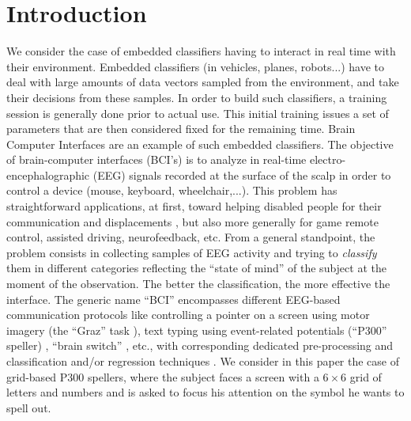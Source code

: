 \documentclass[conference]{IEEEtran}
\begin{document}
\section{Introduction}

We consider the case of embedded classifiers having to interact in real time
with their environment. Embedded classifiers (in vehicles, planes, robots...) have to deal with large
amounts of data vectors sampled from the environment, and take their decisions from these samples. 
In order to build such classifiers, 
a training session is generally done prior to actual use. 
This initial training issues a set of parameters that are then considered fixed 
for the remaining time.
Brain Computer Interfaces are an example of such embedded classifiers. 
The objective of brain-computer interfaces (BCI's) is to analyze in real-time electro-encephalographic (EEG) signals recorded at the surface of the scalp in order to control a device 
(mouse, keyboard, wheelchair,...). This problem has straightforward applications, at first, toward helping disabled people 
for their communication \cite{Farwell88} and displacements \cite{Vanacker2007}, but also more generally for game remote control, 
assisted driving, neurofeedback, etc.
From a general standpoint, the problem consists in collecting samples of EEG activity
 and trying to \emph{classify} them in different categories reflecting the ``state of mind'' of the subject
at the moment of the observation. The better the classification, the more effective the 
interface.
The generic name ``BCI'' encompasses different 
EEG-based communication protocols like controlling a pointer on a screen 
using motor imagery (the ``Graz'' task \cite{Pfurtscheller1997}), text typing 
using event-related potentials (``P300'' speller) \cite{Farwell88}, ``brain switch'' \cite{Mason00}, etc.,  
with corresponding dedicated pre-processing \cite{Blankertz08,Rivet09,Ang12} and  
classification and/or regression techniques \cite{Pfurtscheller1997,Krusienski08,Hoffmann08}.
We consider in this paper the case of 
grid-based P300 spellers, where the subject faces a screen with a $6 \times 6$ grid 
of letters and numbers 
and is asked to focus his attention on the symbol he wants to spell out.
\end{document}
